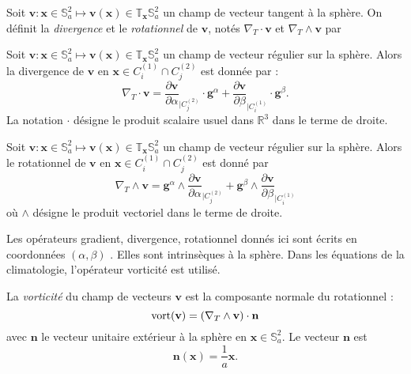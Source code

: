 Soit $\mathbf{v} : \mathbf{x} \in \mathbb{S}_a^2 \mapsto \mathbf{v}(\mathbf{x}) \in \mathbb{T}_{\mathbf{x}} \mathbb{S}_a^2$ un champ de vecteur tangent à la sphère. On définit la \textit{divergence} et le \textit{rotationnel} de $\mathbf{v}$, notés $\nabla_T \cdot \mathbf{v}$ et $\nabla_T \wedge \mathbf{v}$ par

\begin{definition}
Soit $\mathbf{v} : \mathbf{x} \in \mathbb{S}_a^2 \mapsto \mathbf{v}(\mathbf{x}) \in \mathbb{T}_{\mathbf{x}} \mathbb{S}_a^2$ un champ de vecteur régulier sur la sphère. Alors la divergence de $\mathbf{v}$ en $\mathbf{x} \in C_i^{(1)} \cap C_j^{(2)}$ est donnée par :
\begin{equation}
\nabla_T \cdot \mathbf{v} = \dfrac{\partial \mathbf{v}}{\partial \alpha}_{|C^{(2)}_j} \cdot \mathbf{g}^{\alpha} + \dfrac{\partial \mathbf{v}}{\partial \beta}_{|C^{(1)}_i} \cdot \mathbf{g}^{\beta}.
\end{equation}
\label{def:divergence}
La notation $\cdot$ désigne le produit scalaire usuel dans $\mathbb{R}^3$ dans le terme de droite.
\end{definition}

\begin{definition}
Soit $\mathbf{v} : \mathbf{x} \in \mathbb{S}_a^2 \mapsto \mathbf{v}(\mathbf{x}) \in \mathbb{T}_{\mathbf{x}} \mathbb{S}_a^2$ un champ de vecteur régulier sur la sphère. Alors le rotationnel de $\mathbf{v}$ en $\mathbf{x} \in C_i^{(1)} \cap C_j^{(2)}$ est donné par
\begin{equation}
\nabla_T \wedge \mathbf{v} =  \mathbf{g}^{\alpha} \wedge \dfrac{\partial \mathbf{v}}{\partial \alpha}_{|C^{(2)}_j} + \mathbf{g}^{\beta} \wedge \dfrac{\partial \mathbf{v}}{\partial \beta}_{|C^{(1)}_i}
\end{equation}
où $\wedge$ désigne le produit vectoriel dans le terme de droite.
\label{def:rotationnel}
\end{definition}

Les opérateurs gradient, divergence, rotationnel donnés ici sont écrits en coordonnées $(\alpha, \beta)$ \cite{Simmonds1994}. Elles sont intrinsèques à la sphère. Dans les équations de la climatologie, l'opérateur vorticité est utilisé.

\begin{definition}
La \textit{vorticité} du champ de vecteurs $\mathbf{v}$ est la composante normale du rotationnel :
\begin{equation}
\text{vort} ( \mathbf{v} ) = \left( \nabla_T \wedge \mathbf{v} \right) \cdot \mathbf{n}
\label{eq:vorticité}
\end{equation}
avec $\mathbf{n}$ le vecteur unitaire extérieur à la sphère en $\mathbf{x} \in \mathbb{S}_a^2$. Le vecteur $\mathbf{n}$ est
\begin{equation}
\mathbf{n}(\mathbf{x}) = \dfrac{1}{a} \mathbf{x}.
\end{equation}
\label{def:vorticité}
\end{definition}

